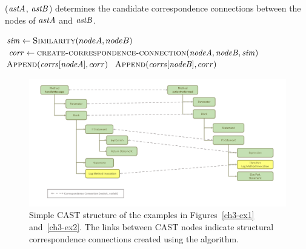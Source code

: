 \begin{algorithm}
  \caption{($\mathit{astA}$, $\mathit{astB}$) determines the candidate correspondence connections between the nodes of $\mathit{astA}$ and $\mathit{astB}$.}
  \label{computeMatches}
  \begin{algorithmic}[1]
  \DeterminePotentialCorrespondences
		
		\State $\mathit{sim} \gets \textsc{Similarity}(nodeA,nodeB)$	
 		\State $\mathit{corr} \gets \textsc{create-correspondence-connection}(\mathit{nodeA},\mathit{nodeB},\mathit{sim})$	
 \State $\textsc{Append}(\mathit{corrs}[\mathit{nodeA}],corr)$	
 \State $\textsc{Append}(\mathit{corrs}[\mathit{nodeB}],corr)$
 		\EndIf 		
 \EndFor 	
	  \EndFor 	
	
  \end{algorithmic}
\end{algorithm}



\begin{figure} [H]  \centering\includegraphics [width = \textwidth]{Drawing4/FirstCorr.pdf}
  \caption[Simple CAST structure of the examples in Figures~\ref{ch3-ex1} and~\ref{ch3-ex2}.]{Simple CAST structure of the examples in Figures~\ref{ch3-ex1} and~\ref{ch3-ex2}. The links between CAST nodes indicate structural correspondence connections created using the  algorithm.}
  \label{fig:meth-ast-1}
\end{figure}

